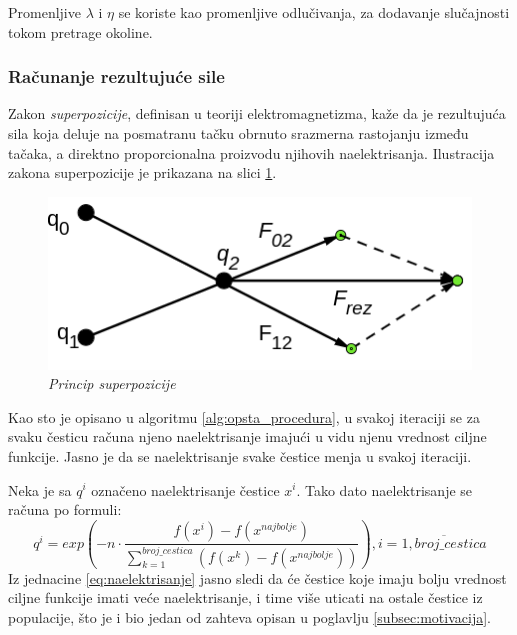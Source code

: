 \documentclass[a4paper]{article}
\begin{document}
Promenljive $\lambda$ i $\eta$ se koriste kao promenljive odlučivanja, za dodavanje slučajnosti tokom pretrage okoline.

\subsubsection{Računanje rezultujuće sile}
\label{subsec:racunanje_sile}

Zakon \textit{superpozicije}, definisan u teoriji elektromagnetizma, kaže da je rezultujuća sila koja deluje na posmatranu tačku obrnuto srazmerna rastojanju između tačaka, a direktno proporcionalna proizvodu njihovih naelektrisanja. Ilustracija zakona superpozicije je prikazana na slici \ref{fig:superpozicija}.

\begin{figure}[H]
\begin{center}
\includegraphics[scale=0.3]{superpoz.png}
\end{center}
\caption{\textit{Princip superpozicije}}
\label{fig:superpozicija}
\end{figure}

Kao sto je opisano u algoritmu \ref{alg:opsta_procedura}, u svakoj iteraciji se za svaku česticu računa njeno naelektrisanje imajući u vidu njenu vrednost ciljne funkcije. Jasno je da se naelektrisanje svake čestice menja u svakoj iteraciji.

Neka je sa $q^i$ označeno naelektrisanje čestice $x^i$. Tako dato naelektrisanje se računa po formuli: 
\begin{equation}
\label{eq:naelektrisanje}
q^i = exp\left(-n \cdot \frac{f(x^i) - f(x^{najbolje})}{\sum_{k=1}^{broj\_cestica} (f(x^k) - f(x^{najbolje})) }\right), i = \overline{1, broj\_cestica}    
\end{equation}
Iz jednacine \ref{eq:naelektrisanje} jasno sledi da će čestice koje imaju bolju vrednost ciljne funkcije imati veće naelektrisanje, i time više uticati na ostale čestice iz populacije, što je i bio jedan od zahteva opisan u poglavlju \ref{subsec:motivacija}. 
\end{document}
